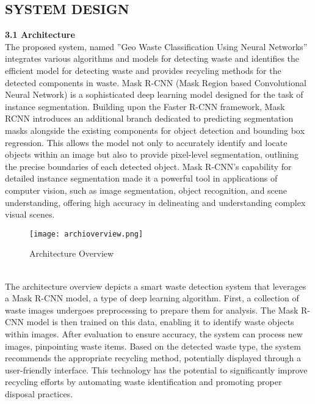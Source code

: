 \documentclass[12pt, English]{article}
\begin{document}
\newpage
\begin{center}
\section{ \Large SYSTEM DESIGN}
\end{center}
\textbf{3.1 Architecture}\\
The proposed system, named ”Geo Waste Classification
Using Neural Networks” integrates various algorithms and
models for detecting waste and identifies the efficient model
for detecting waste and provides recycling methods for the
detected components in waste. Mask R-CNN (Mask Region based Convolutional Neural Network) is a sophisticated deep
learning model designed for the task of instance segmentation. Building upon the Faster R-CNN framework, Mask RCNN introduces an additional branch dedicated to predicting segmentation masks alongside the existing components for object detection and bounding box regression. This allows the model not only to accurately identify and locate objects within an image but also to provide pixel-level segmentation, outlining the precise boundaries of each detected object. Mask R-CNN’s capability for detailed instance segmentation made it a powerful tool in applications of computer vision, such as
image segmentation, object recognition, and scene understanding, offering high accuracy in delineating and understanding
complex visual scenes.\\
\begin{figure}[htb]
\begin{center}
\texttt{[image: archioverview.png]}
\end{center}
\begin{center}
\renewcommand{\thefigure}{3.1}
\caption{\footnotesize Architecture Overview }
\end{center}
\end{figure}\\
The architecture overview depicts a smart waste detection system that leverages a Mask R-CNN model, a type of deep learning algorithm. First, a collection of waste images undergoes preprocessing to prepare them for analysis. The Mask R-CNN model is then trained on this data, enabling it to identify waste objects within images. After evaluation to ensure accuracy, the system can process new images, pinpointing waste items. Based on the detected waste type, the system recommends the appropriate recycling method, potentially displayed through a user-friendly interface. This technology has the potential to significantly improve recycling efforts by automating waste identification and promoting proper disposal practices.\\
\end{document}
